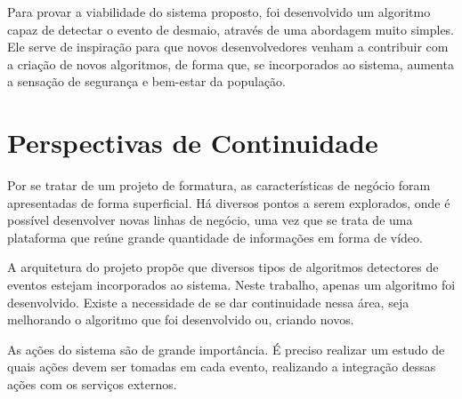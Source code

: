 \documentclass[]{politex}
\begin{document}
Para provar a viabilidade do sistema proposto, foi desenvolvido um algoritmo capaz de detectar o evento de desmaio, através de uma abordagem muito simples. Ele serve de inspiração para que novos desenvolvedores venham a contribuir com a criação de novos algoritmos, de forma que, se incorporados ao sistema, aumenta a sensação de segurança e bem-estar da população. 


\section{Perspectivas de Continuidade}
Por se tratar de um projeto de formatura, as características de negócio foram apresentadas de forma superficial. Há diversos pontos a serem explorados, onde é possível desenvolver novas linhas de negócio, uma vez que se trata de uma plataforma que reúne grande quantidade de informações em forma de vídeo.

A arquitetura do projeto propõe que diversos tipos de algoritmos detectores de eventos estejam incorporados ao sistema. Neste trabalho, apenas um algoritmo foi desenvolvido. Existe a necessidade de se dar continuidade nessa área, seja melhorando o algoritmo que foi desenvolvido ou, criando novos.

As ações do sistema são de grande importância. É preciso realizar um estudo de quais ações devem ser tomadas em cada evento, realizando a integração dessas ações com os serviços externos.





%


\nocite{epigirafe}

% 


\end{document}
